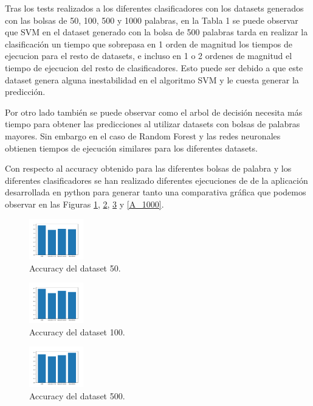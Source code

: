 \documentclass[11pt,a4paper]{article}
\begin{document}
Tras los tests realizados a los diferentes clasificadores con los datasets generados con las bolsas de 50, 100, 500 y 1000 palabras, en la Tabla 1 se puede observar que SVM en el dataset generado con la bolsa de 500 palabras tarda en realizar la clasificación un tiempo que sobrepasa en 1 orden de magnitud los tiempos de ejecucion para el resto de datasets, e incluso en 1 o 2 ordenes de magnitud el tiempo de ejecucion del resto de clasificadores. Esto puede ser debido a que este dataset genera alguna inestabilidad en el algoritmo SVM y le cuesta generar la predicción. 

Por otro lado también se puede observar como el arbol de decisión necesita más tiempo para obtener las predicciones al utilizar datasets con bolsas de palabras mayores. Sin embargo en el caso de Random Forest y las redes neuronales obtienen tiempos de ejecución similares para los diferentes datasets.

Con respecto al accuracy obtenido para las diferentes bolsas de palabra y los diferentes clasificadores se han realizado diferentes ejecuciones de de la aplicación desarrollada en python para generar tanto una comparativa gráfica que podemos observar en las Figuras \ref{A_50}, \ref{A_100}, \ref{A_500} y \ref{A_1000}.

\begin{figure}[H]
\centering
\includegraphics[width=0.21\textwidth]{.//50.png}
\caption{Accuracy del dataset 50.}
\label{A_50}
\end{figure}

\begin{figure}[H]
\centering
\includegraphics[width=0.21\textwidth]{.//100.png}
\caption{Accuracy del dataset 100.}
\label{A_100}
\end{figure}

\begin{figure}[H]
\centering
\includegraphics[width=0.21\textwidth]{.//500.png}
\caption{Accuracy del dataset 500.}
\label{A_500}
\end{figure}
\end{document}
